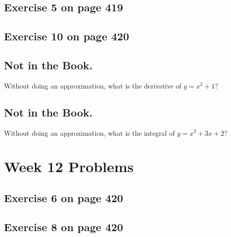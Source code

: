 \documentclass[12pt]{amsart}
\begin{document}
\subsection{ Exercise 5 on page 419}
\subsection{Exercise 10 on page 420} 
\subsection{Not in the Book.} Without doing an approximation, what is the derivative of $y=x^2+1$?
\subsection{Not in the Book.} Without doing an approximation, what is the integral of $y=x^2+3x+2$? 

\section{Week 12 Problems}
\subsection{Exercise 6 on page 420}
\subsection{Exercise 8 on page 420}



  
\end{document}
